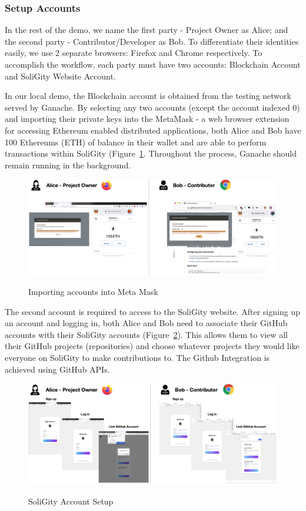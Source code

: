 \documentclass[12pt]{article}
\renewcommand{\_}{\kern-1.5pt\textunderscore\kern-1.5pt}
\begin{document}
\subsubsection{Setup Accounts}
In the rest of the demo, we name the first party - Project Owner as Alice; and the second party - Contributor/Developer as Bob. To differentiate their identities easily, we use 2 separate browsers: Firefox and Chrome respectively. To accomplish the workflow, each party must have two accounts: Blockchain Account and SoliGity Website Account. 

In our local demo, the Blockchain account is obtained from the testing network served by Ganache. By selecting any two accounts (except the account indexed 0) and importing their private keys into the MetaMask - a web browser extension for accessing Ethereum enabled distributed applications, both Alice and Bob have 100 Ethereums (ETH) of balance in their wallet and are able to perform transactions within SoliGity  (Figure~\ref{fig:setup5}. Throughout the process, Ganache should remain running in the background.

\begin{figure}[H]
	\centering
	\includegraphics[width=16.5cm]{graphs/48. setup_3.png}\\
	\caption{Importing accounts into Meta Mask}
	\label{fig:setup5}
\end{figure}

The second account is required to access to the SoliGity website. After signing up an account and logging in, both Alice and Bob need to associate their GitHub accounts with their SoliGity accounts (Figure~\ref{fig:setup6}). This allows them to view all their GitHub projects (repositories) and choose whatever projects they would like everyone on SoliGity to make contributions to. The Github Integration is achieved using GitHub APIs. 

\begin{figure}[H]
	\centering
	\includegraphics[width=16.5cm]{graphs/49. setup_4.png}\\
	\caption{SoliGity Account Setup}
	\label{fig:setup6}
\end{figure}
\end{document}
